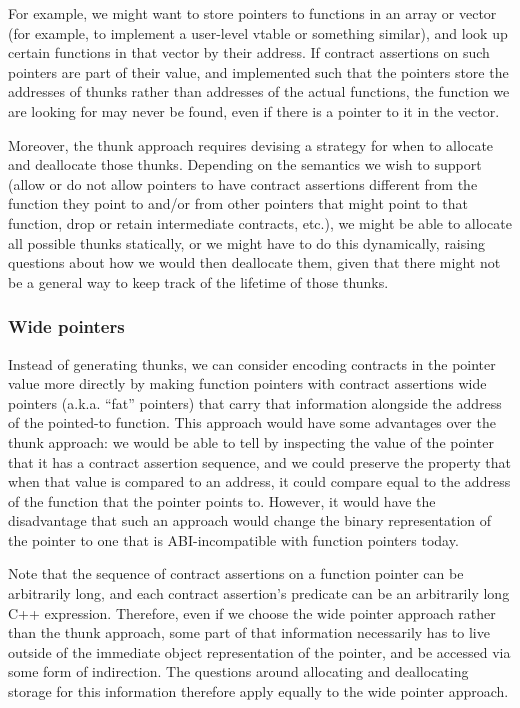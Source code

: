 For example, we might want to store pointers to functions in an array or vector (for example, to implement a user-level vtable or something similar), and look up certain functions in that vector by their address. If contract assertions on such pointers are part of their value, and implemented such that the pointers store the addresses of thunks rather than addresses of the actual functions, the function we are looking for may never be found, even if there is a pointer to it in the vector.

Moreover, the thunk approach requires devising a strategy for when to allocate and deallocate those thunks. Depending on the semantics we wish to support (allow or do not allow pointers to have contract assertions different from the function they point to and/or from other pointers that might point to that function, drop or retain intermediate contracts, etc.), we might be able to allocate all possible thunks statically, or we might have to do this dynamically, raising questions about how we would then deallocate them, given that there might not be a general way to keep track of the lifetime of those thunks.


\subsubsection{Wide pointers}

Instead of generating thunks, we can consider encoding contracts in the pointer value more directly by making function pointers with contract assertions wide pointers (a.k.a. ``fat'' pointers) that carry that information alongside the address of the pointed-to function. This approach would have some advantages over the thunk approach: we would be able to tell by inspecting the value of the pointer that it has a contract assertion sequence, and we could preserve the property that when that value is compared to an address, it could compare equal to the address of the function that the pointer points to. However, it would have the disadvantage that such an approach would change the binary representation of the pointer to one that is ABI-incompatible with function pointers today.

Note that the sequence of contract assertions on a function pointer can be arbitrarily long, and each contract assertion's predicate can be an arbitrarily long C++ expression. Therefore, even if we choose the wide pointer approach rather than the thunk approach, some part of that information necessarily has to live outside of the immediate object representation of the pointer, and be accessed via some form of indirection. The questions around allocating and deallocating storage for this information therefore apply equally to the wide pointer approach.

